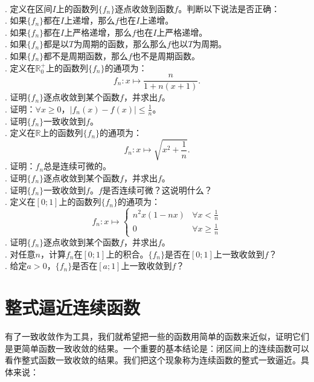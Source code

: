 \documentclass[12pt,UTF8]{ctexbook}
\begin{document}
\begin{xt}
    \mbox{} \\
    . 定义在区间$I$上的函数列$\{f_n\}$逐点收敛到函数$f$。判断以下说法是否正确：\\
    . 如果$\{f_n\}$都在$I$上递增，那么$f$也在$I$上递增。\\
    . 如果$\{f_n\}$都在$I$上严格递增，那么$f$也在$I$上严格递增。\\
    . 如果$\{f_n\}$都是以$T$为周期的函数，那么那么$f$也以$T$为周期。\\
    . 如果$\{f_n\}$都不是周期函数，那么$f$也不是周期函数。\\
    . 定义在$\mathbb{R}_0^+$上的函数列$\{f_n\}$的通项为：
    $$ f_n: x\mapsto \frac{n}{1 + n( x + 1)}. $$
    . 证明$\{f_n\}$逐点收敛到某个函数$f$，并求出$f$。\\
    . 证明：$\forall x \geqslant 0$，$|f_n(x) - f(x)| \leqslant \frac{1}{n}$。\\
    . 证明$\{f_n\}$一致收敛到$f$。\\
    . 定义在$\mathbb{R}$上的函数列$\{f_n\}$的通项为：
    $$ f_n: x\mapsto \sqrt{x^2 + \frac{1}{n}}. $$
    . 证明：$f_n$总是连续可微的。\\
    . 证明$\{f_n\}$逐点收敛到某个函数$f$，并求出$f$。\\
    . 证明$\{f_n\}$一致收敛到$f$。$f$是否连续可微？这说明什么？\\
    . 定义在$[0;1]$上的函数列$\{f_n\}$的通项为：
    $$ f_n: x\mapsto \begin{cases}
        n^2x(1 - nx) & \forall x < \frac{1}{n} \\
        0 & \forall x \geqslant \frac{1}{n}
    \end{cases} $$
    . 证明$\{f_n\}$逐点收敛到某个函数$f$，并求出$f$。\\
    . 对任意$n$，计算$f_n$在$[0;1]$上的积合。$\{f_n\}$是否在$[0;1]$上一致收敛到$f$？\\
    . 给定$a>0$，$\{f_n\}$是否在$[a;1]$上一致收敛到$f$？
\end{xt}

\section{整式逼近连续函数}
有了一致收敛作为工具，我们就希望把一些的函数用简单的函数来近似，证明它们是更简单函数一致收敛的结果。一个重要的基本结论是：闭区间上的连续函数可以看作整式函数一致收敛的结果。我们把这个现象称为连续函数的整式一致逼近。具体来说：
\end{document}
